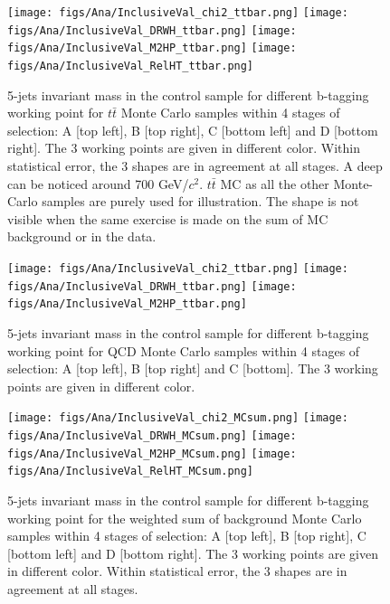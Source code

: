 \begin{figure}[!Hhtbp]
  \begin{center}
    \texttt{[image: figs/Ana/InclusiveVal\_chi2\_ttbar.png]}
    \texttt{[image: figs/Ana/InclusiveVal\_DRWH\_ttbar.png]}
    \texttt{[image: figs/Ana/InclusiveVal\_M2HP\_ttbar.png]}
    \texttt{[image: figs/Ana/InclusiveVal\_RelHT\_ttbar.png]}
    \caption{5-jets invariant mass in the control sample for different b-tagging working point for $t\bar{t}$ Monte Carlo samples within 4 stages of selection: A [top left], B [top right], C [bottom left] and D [bottom right]. The 3 working points are given in different color. Within statistical error, the 3 shapes are in agreement at all stages. A deep can be noticed around 700 GeV/$c^{2}$. $t\bar{t}$ MC as all the other Monte-Carlo samples are purely used for illustration. The shape is not visible when the same exercise is made on the sum of MC background or in the data.}
    \label{fig:StageWPttbar}
  \end{center}
\end{figure}

\begin{figure}[!Hhtbp]
  \begin{center}
    \texttt{[image: figs/Ana/InclusiveVal\_chi2\_ttbar.png]}
    \texttt{[image: figs/Ana/InclusiveVal\_DRWH\_ttbar.png]}
    \texttt{[image: figs/Ana/InclusiveVal\_M2HP\_ttbar.png]}
    \caption{5-jets invariant mass in the control sample for different b-tagging working point for QCD Monte Carlo samples within 4 stages of selection: A [top left], B [top right] and C [bottom]. The 3 working points are given in different color.}
    \label{fig:StageWPQCD}
  \end{center}
\end{figure}

\begin{figure}[!Hhtbp]
  \begin{center}
    \texttt{[image: figs/Ana/InclusiveVal\_chi2\_MCsum.png]}
    \texttt{[image: figs/Ana/InclusiveVal\_DRWH\_MCsum.png]}
    \texttt{[image: figs/Ana/InclusiveVal\_M2HP\_MCsum.png]}
    \texttt{[image: figs/Ana/InclusiveVal\_RelHT\_MCsum.png]}
    \caption{5-jets invariant mass in the control sample for different b-tagging working point for the weighted sum of background Monte Carlo samples within 4 stages of selection: A [top left], B [top right], C [bottom left] and D [bottom right]. The 3 working points are given in different color. Within statistical error, the 3 shapes are in agreement at all stages.}
    \label{fig:StageWPSum}
  \end{center}
\end{figure}

